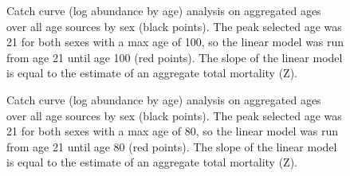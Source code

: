 \documentclass[
]{scrartcl}
\begin{document}
\begin{figure}[H]


\caption{\label{fig-CC_Z_100}Catch curve (log abundance by age) analysis
on aggregated ages over all age sources by sex (black points). The peak
selected age was 21 for both sexes with a max age of 100, so the linear
model was run from age 21 until age 100 (red points). The slope of the
linear model is equal to the estimate of an aggregate total mortality
(Z).}

\end{figure}%

\begin{figure}[H]


\caption{\label{fig-CC_Z_80}Catch curve (log abundance by age) analysis
on aggregated ages over all age sources by sex (black points). The peak
selected age was 21 for both sexes with a max age of 80, so the linear
model was run from age 21 until age 80 (red points). The slope of the
linear model is equal to the estimate of an aggregate total mortality
(Z).}

\end{figure}%
\end{document}
